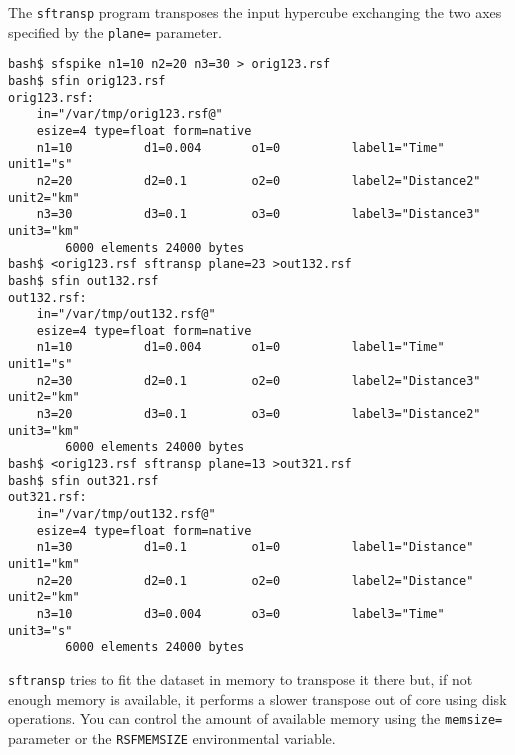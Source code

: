 The \texttt{sftransp} program transposes the input hypercube
exchanging the two axes specified by the \texttt{plane=} parameter. 
\begin{verbatim}
bash$ sfspike n1=10 n2=20 n3=30 > orig123.rsf
bash$ sfin orig123.rsf 
orig123.rsf:
    in="/var/tmp/orig123.rsf@"
    esize=4 type=float form=native 
    n1=10          d1=0.004       o1=0          label1="Time" unit1="s" 
    n2=20          d2=0.1         o2=0          label2="Distance2" unit2="km" 
    n3=30          d3=0.1         o3=0          label3="Distance3" unit3="km" 
        6000 elements 24000 bytes
bash$ <orig123.rsf sftransp plane=23 >out132.rsf
bash$ sfin out132.rsf 
out132.rsf:
    in="/var/tmp/out132.rsf@"
    esize=4 type=float form=native 
    n1=10          d1=0.004       o1=0          label1="Time" unit1="s" 
    n2=30          d2=0.1         o2=0          label2="Distance3" unit2="km" 
    n3=20          d3=0.1         o3=0          label3="Distance2" unit3="km" 
        6000 elements 24000 bytes
bash$ <orig123.rsf sftransp plane=13 >out321.rsf
bash$ sfin out321.rsf 
out321.rsf:
    in="/var/tmp/out132.rsf@"
    esize=4 type=float form=native 
    n1=30          d1=0.1         o1=0          label1="Distance" unit1="km" 
    n2=20          d2=0.1         o2=0          label2="Distance" unit2="km" 
    n3=10          d3=0.004       o3=0          label3="Time" unit3="s" 
        6000 elements 24000 bytes
\end{verbatim}
\texttt{sftransp} tries to fit the dataset in memory to transpose it
there but, if not enough memory is available, it performs a slower
transpose out of core using disk operations. You can control the
amount of available memory using the \texttt{memsize=} parameter or
the \texttt{RSFMEMSIZE} environmental variable.


\noindent\doublebox{\parbox{\textwidth}{
    
  }}

